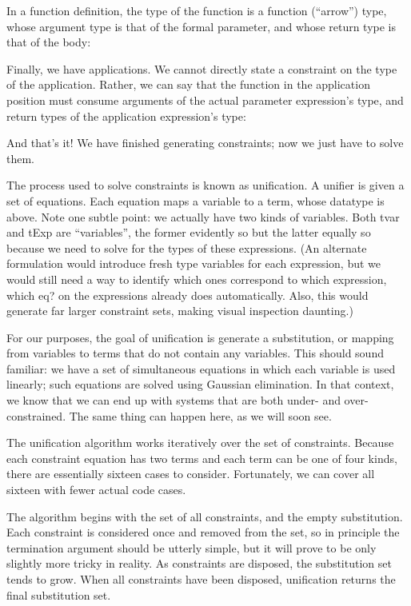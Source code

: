 In a function definition, the type of the function is a function (“arrow”) type, whose
argument type is that of the formal parameter, and whose return type is that of the body:

Finally, we have applications. We cannot directly state a constraint on the type of
the application. Rather, we can say that the function in the application position must
consume arguments of the actual parameter expression’s type, and return types of the
application expression’s type:

And that’s it! We have finished generating constraints; now we just have to solve
them.


The process used to solve constraints is known as unification. A unifier is given a
set of equations. Each equation maps a variable to a term, whose datatype is above.
Note one subtle point: we actually have two kinds of variables. Both tvar and tExp
are “variables”, the former evidently so but the latter equally so because we need to
solve for the types of these expressions. (An alternate formulation would introduce
fresh type variables for each expression, but we would still need a way to identify
which ones correspond to which expression, which eq? on the expressions already
does automatically. Also, this would generate far larger constraint sets, making visual
inspection daunting.)

For our purposes, the goal of unification is generate a substitution, or mapping
from variables to terms that do not contain any variables. This should sound familiar:
we have a set of simultaneous equations in which each variable is used linearly; such
equations are solved using Gaussian elimination. In that context, we know that we can
end up with systems that are both under- and over-constrained. The same thing can
happen here, as we will soon see.

The unification algorithm works iteratively over the set of constraints. Because
each constraint equation has two terms and each term can be one of four kinds, there
are essentially sixteen cases to consider. Fortunately, we can cover all sixteen with
fewer actual code cases.

The algorithm begins with the set of all constraints, and the empty substitution.
Each constraint is considered once and removed from the set, so in principle the termination
argument should be utterly simple, but it will prove to be only slightly more
tricky in reality. As constraints are disposed, the substitution set tends to grow. When
all constraints have been disposed, unification returns the final substitution set.

